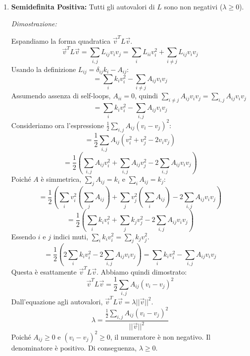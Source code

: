 \begin{enumerate}
		\item \textbf{Semidefinita Positiva:} Tutti gli autovalori di $L$ sono non negativi ($\lambda \ge 0$).
		
		\textit{Dimostrazione:}
        
        Espandiamo la forma quadratica $\vec{v}^T L \vec{v}$.
\begin{equation}
	\vec{v}^T L \vec{v} = \sum_{i,j} L_{ij} v_i v_j = \sum_{i} L_{ii} v_i^2 + \sum_{i \neq j} L_{ij} v_i v_j
\end{equation}
Usando la definizione $L_{ij} = \delta_{ij}k_i - A_{ij}$:
\begin{equation}
	= \sum_{i} k_i v_i^2 - \sum_{i \neq j} A_{ij} v_i v_j
\end{equation}
Assumendo assenza di self-loops, $A_{ii}=0$, quindi $\sum_{i \neq j} A_{ij} v_i v_j = \sum_{i,j} A_{ij} v_i v_j$
\begin{equation}
	= \sum_{i} k_i v_i^2 - \sum_{i,j} A_{ij} v_i v_j
\end{equation}
Consideriamo ora l'espressione $\frac{1}{2} \sum_{i,j} A_{ij} (v_i - v_j)^2$:
\begin{equation}
	= \frac{1}{2} \sum_{i,j} A_{ij} (v_i^2 + v_j^2 - 2v_i v_j)
\end{equation}
\begin{equation}
	= \frac{1}{2} \left( \sum_{i,j} A_{ij} v_i^2 + \sum_{i,j} A_{ij} v_j^2 - 2\sum_{i,j} A_{ij} v_i v_j \right)
\end{equation}
Poiché $A$ è simmetrica, $\sum_{j} A_{ij} = k_i$ e $\sum_{i} A_{ij} = k_j$:
\begin{equation}
	= \frac{1}{2} \left( \sum_{i} v_i^2 \left(\sum_{j} A_{ij}\right) + \sum_{j} v_j^2 \left(\sum_{i} A_{ij}\right) - 2\sum_{i,j} A_{ij} v_i v_j \right)
\end{equation}
\begin{equation}
	= \frac{1}{2} \left( \sum_{i} k_i v_i^2 + \sum_{j} k_j v_j^2 - 2\sum_{i,j} A_{ij} v_i v_j \right)
\end{equation}
Essendo $i$ e $j$ indici muti, $\sum_{i} k_i v_i^2 = \sum_{j} k_j v_j^2$.
\begin{equation}
	= \frac{1}{2} \left( 2\sum_{i} k_i v_i^2 - 2\sum_{i,j} A_{ij} v_i v_j \right) = \sum_{i} k_i v_i^2 - \sum_{i,j} A_{ij} v_i v_j
\end{equation}
Questa è esattamente $\vec{v}^T L \vec{v}$.
Abbiamo quindi dimostrato:
\begin{equation}
	\vec{v}^T L \vec{v} = \frac{1}{2} \sum_{i,j} A_{ij} (v_i - v_j)^2
\end{equation}
Dall'equazione agli autovalori, $\vec{v}^T L \vec{v} = \lambda ||\vec{v}||^2$.
\begin{equation}
	\lambda = \frac{\frac{1}{2} \sum_{i,j} A_{ij} (v_i - v_j)^2}{||\vec{v}||^2}
\end{equation}
Poiché $A_{ij} \ge 0$ e $(v_i - v_j)^2 \ge 0$, il numeratore è non negativo. Il denominatore è positivo. Di conseguenza, $\lambda \ge 0$.
		

\end{enumerate}
